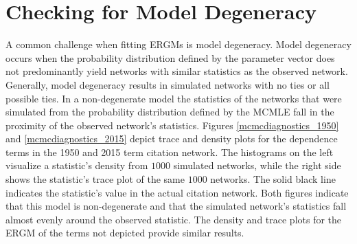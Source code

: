 \documentclass[headsepline=true, abstracton]{scrartcl}
\begin{document}
\section{Checking for Model Degeneracy}

A common challenge when fitting ERGMs is model degeneracy. Model degeneracy occurs when the probability distribution defined by the parameter vector does not predominantly yield networks with similar statistics as the observed network. Generally, model degeneracy results in simulated networks with no ties or all possible ties. In a non-degenerate model the statistics of the networks that were simulated from the probability distribution defined by the MCMLE fall in the proximity of the observed network's statistics. Figures \ref{mcmcdiagnostics_1950} and \ref{mcmcdiagnostics_2015} depict trace and density plots for the dependence terms in the 1950 and 2015 term citation network. The histograms on the left visualize a statistic's density from $1000$ simulated networks, while the right side shows the statistic's trace plot of the same $1000$ networks. The solid black line indicates the statistic's value in the actual citation network. Both figures indicate that this model is non-degenerate and that the simulated network's statistics fall almost evenly around the observed statistic. The density and trace plots for the ERGM of the terms not depicted provide similar results.
\end{document}
